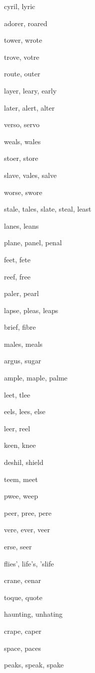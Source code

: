     \item cyril, lyric
    \item adorer, roared
    \item tower, wrote
    \item trove, votre
    \item route, outer
    \item layer, leary, early
    \item later, alert, alter
    \item verso, servo
    \item weals, wales
    \item stoer, store
    \item slave, vales, salve
    \item worse, swore
    \item stale, tales, slate, steal, least
    \item lanes, leans
    \item plane, panel, penal
    \item feet, fete
    \item reef, free
    \item paler, pearl
    \item lapse, pleas, leaps
    \item brief, fibre
    \item males, meals
    \item argus, sugar
    \item ample, maple, palme
    \item leet, tlee
    \item eels, lees, else
    \item leer, reel
    \item keen, knee
    \item deshil, shield
    \item teem, meet
    \item pwee, weep
    \item peer, pree, pere
    \item vere, ever, veer
    \item erse, seer
    \item flies', life's, 'slife
    \item crane, cenar
    \item toque, quote
    \item haunting, unhating
    \item crape, caper
    \item space, paces
    \item peaks, speak, spake
